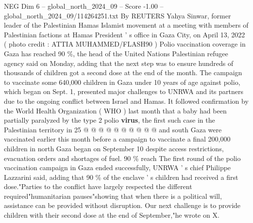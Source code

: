\begin{textsample}{NEG Dim 6 – global\_north\_2024\_09 – Score -1.00 – global\_north\_2024\_09/114264251.txt}
By REUTERS Yahya Sinwar, former leader of the Palestinian Hamas Islamist movement at a meeting with members of Palestinian factions at Hamas President ' s office in Gaza City, on April 13, 2022 ( photo credit : ATTIA MUHAMMED/FLASH90 ) Polio vaccination coverage in Gaza has reached 90 \%, the head of the United Nations Palestinian refugee agency said on Monday, adding that the next step was to ensure hundreds of thousands of children got a second dose at the end of the month.
The campaign to vaccinate some 640,000 children in Gaza under 10 years of age against polio, which began on Sept. 1, presented major challenges to UNRWA and its partners due to the ongoing conflict between Israel and Hamas.
It followed confirmation by the World Health Organization ( WHO ) last month that a baby had been partially paralyzed by the type 2 polio \textbf{virus}, the first such case in the Palestinian territory in 25 @ @ @ @ @ @ @ @ @ @ and south Gaza were vaccinated earlier this month before a campaign to vaccinate a final 200,000 children in north Gaza began on September 10 despite access restrictions, evacuation orders and shortages of fuel. 90 \% reach The first round of the polio vaccination campaign in Gaza ended successfully, UNRWA ' s chief Philippe Lazzarini said, adding that 90 \% of the enclave ' s children had received a first dose."Parties to the conflict have largely respected the different required"humanitarian pauses"showing that when there is a political will, assistance can be provided without disruption.
Our next challenge is to provide children with their second dose at the end of September,"he wrote on X.

\end{textsample}
